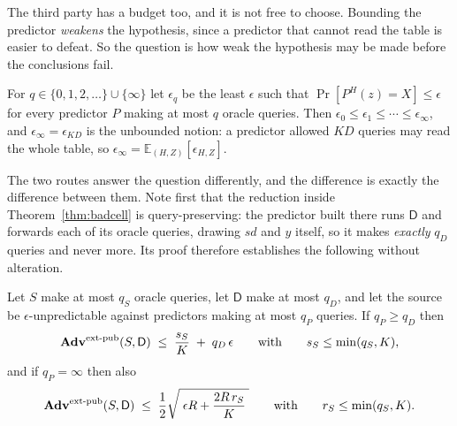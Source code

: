 \documentclass{aicr-solution}
\newcommand{\Adv}{\mathbf{Adv}}
\newcommand{\sd}{\mathit{sd}}
\newcommand{\extpub}{\textup{ext-pub}}
\begin{document}
The third party has a budget too, and it is not free to choose. Bounding the predictor
\emph{weakens} the hypothesis, since a predictor that cannot read the table is easier to defeat. So
the question is how weak the hypothesis may be made before the conclusions fail.
\begin{definition}\label{def:epsq}
For $q \in \{0,1,2,\dots\} \cup \{\infty\}$ let $\epsilon_q$ be the least $\epsilon$ such that
$\Pr[P^{H}(z) = X] \le \epsilon$ for every predictor $P$ making at most $q$ oracle queries. Then
$\epsilon_0 \le \epsilon_1 \le \cdots \le \epsilon_\infty$, and $\epsilon_\infty = \epsilon_{KD}$ is
the unbounded notion: a predictor allowed $KD$ queries may read the whole table, so
$\epsilon_\infty = \mathbb{E}_{(H,Z)}[\epsilon_{H,Z}]$.
\end{definition}
The two routes answer the question differently, and the difference is exactly the difference between
them. Note first that the reduction inside Theorem~\ref{thm:badcell} is query-preserving: the
predictor built there runs $\mathsf{D}$ and forwards each of its oracle queries, drawing $\sd$ and
$y$ itself, so it makes \emph{exactly} $q_D$ queries and never more. Its proof therefore establishes
the following without alteration.
\begin{theorem}\label{thm:three}
Let $S$ make at most $q_S$ oracle queries, let $\mathsf{D}$ make at most $q_D$, and let the source
be $\epsilon$-unpredictable against predictors making at most $q_P$ queries. If $q_P \ge q_D$ then
\begin{equation}\label{eq:three-badcell}
  \Adv^{\extpub}(S,\mathsf{D}) \;\le\; \frac{s_S}{K} \;+\; q_D\,\epsilon
  \qquad\text{with}\qquad s_S \le \min(q_S,K) ,
\end{equation}
and if $q_P = \infty$ then also
\begin{equation}\label{eq:three-lhl}
  \Adv^{\extpub}(S,\mathsf{D}) \;\le\; \frac12\sqrt{\;\epsilon R + \frac{2R\,r_S}{K}\;}
  \qquad\text{with}\qquad r_S \le \min(q_S,K) .
\end{equation}
\end{theorem}
\end{document}
